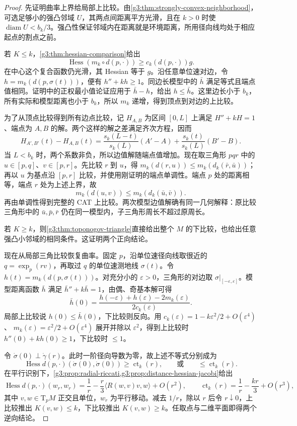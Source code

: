 \begin{proof}
	先证明曲率上界给局部上比较。由\cref{g3:thm:strongly-convex-neighborhood}，可选足够小的强凸邻域 \(U\)，其两点间距离平方光滑，且在 \(k>0\) 时使 \(\operatorname{diam}U<b_k/3\)。强凸性保证邻域内在距离就是环境距离，所用径向线均处于相应起点的割点之前。

	若 \(K\le k\)，\cref{g3:thm:hessian-comparison}给出
	\[
		\operatorname{Hess}(m_k\circ d(p,\cdot))
		\ge c_k(d(p,\cdot))g.
	\]
	在中心这个复合函数仍光滑，其 Hessian 等于 \(g\)。沿任意单位速对边，令 \(h=m_k(d(p,\sigma(t)))\)，便有 \(h''+kh\ge1\)。同边长模型中的 \(\bar h\) 满足等式且端点值相同。证明中的正权最小值论证应用于 \(\bar h-h\)，给出 \(h\le\bar h\)。这里边长小于 \(b_k\)，所有实际和模型距离也小于 \(b_k\)，所以 \(m_k\) 递增，得到顶点到对边的上比较。

	为了从顶点比较得到所有边点比较，记 \(H_{A,B}\) 为区间 \([0,L]\) 上满足 \(H''+kH=1\)、端点为 \(A,B\) 的解。两个这样的解之差满足齐次方程，因而
	\[
		H_{A',B'}(t)-H_{A,B}(t)
		=\frac{s_k(L-t)}{s_k(L)}(A'-A)
		+\frac{s_k(t)}{s_k(L)}(B'-B).
	\]
	当 \(L<b_k\) 时，两个系数非负，所以边值解随端点值增加。现在取三角形 \(pqr\) 中的 \(u\in[p,q]\)、\(v\in[p,r]\)。先比较 \(r\) 到 \(u\)，得
	\(m_k(d(r,u))\le m_k(d_k(\bar r,\bar u))\)；再以 \(u\) 为基点沿 \([p,r]\) 比较，并使用刚证明的端点单调性。端点 \(p\) 处的距离相等，端点 \(r\) 处为上述上界，故
	\[
		m_k(d(u,v))\le m_k(d_k(\bar u,\bar v)).
	\]
	再由单调性得到完整的 CAT 上比较。两次模型边值解确有同一几何解释：原比较三角形中的 \(\bar u,\bar p,\bar r\) 仍在同一模型内，子三角形周长不超过原周长。

	若 \(K\ge k\)，则\cref{g3:thm:toponogov-triangle}直接给出整个 \(M\) 的下比较，也给出任意强凸小邻域的相同条件。这证明两个正向结论。

	现在从局部三角比较恢复曲率。固定 \(p\)，沿单位速径向线取很近的 \(q=\exp_p(rv)\)，再取过 \(q\) 的单位速测地线 \(\sigma(t)\)。令 \(h(t)=m_k(d(p,\sigma(t)))\)。对充分小的 \(\varepsilon>0\)，三角形的对边取 \(\sigma|_{[-\varepsilon,\varepsilon]}\)。模型距离函数 \(\bar h\) 满足 \(\bar h''+k\bar h=1\)，由偶、奇基本解可得
	\[
		\bar h(0)=\frac{h(-\varepsilon)+h(\varepsilon)-2m_k(\varepsilon)}{2c_k(\varepsilon)}.
	\]
	局部上比较说 \(h(0)\le\bar h(0)\)，下比较则反向。用
	\(c_k(\varepsilon)=1-k\varepsilon^2/2+O(\varepsilon^4)\)、
	\(m_k(\varepsilon)=\varepsilon^2/2+O(\varepsilon^4)\)
	展开并除以 \(\varepsilon^2\)，得到上比较时 \(h''(0)+kh(0)\ge1\)，下比较时 \(\le1\)。

	令 \(\dot\sigma(0)\perp\dot\gamma(r)\)。此时一阶径向导数为零，故上述不等式分别成为
	\[
		\operatorname{Hess}d(p,\cdot)(\dot\sigma(0),\dot\sigma(0))
		\ge\operatorname{ct}_k(r),\qquad\text{或}\qquad\le\operatorname{ct}_k(r).
	\]
	在平行识别下，\cref{g3:prop:radial-riccati,g3:prop:distance-hessian-jacobi}给出
	\[
		\operatorname{Hess}d(p,\cdot)(w_r,w_r)
		=\frac1r-\frac r3\langle R(w,v)v,w\rangle+O(r^2),
		\qquad\operatorname{ct}_k(r)=\frac1r-\frac{kr}{3}+O(r^3),
	\]
	其中 \(v,w\in\mathrm T_pM\) 正交且单位，\(w_r\) 为平行移动。减去 \(1/r\)，除以 \(r\) 后令 \(r\downarrow0\)，上比较推出 \(K(v,w)\le k\)，下比较推出 \(K(v,w)\ge k\)。任取点与二维平面即得两个逆向结论。
\end{proof}

